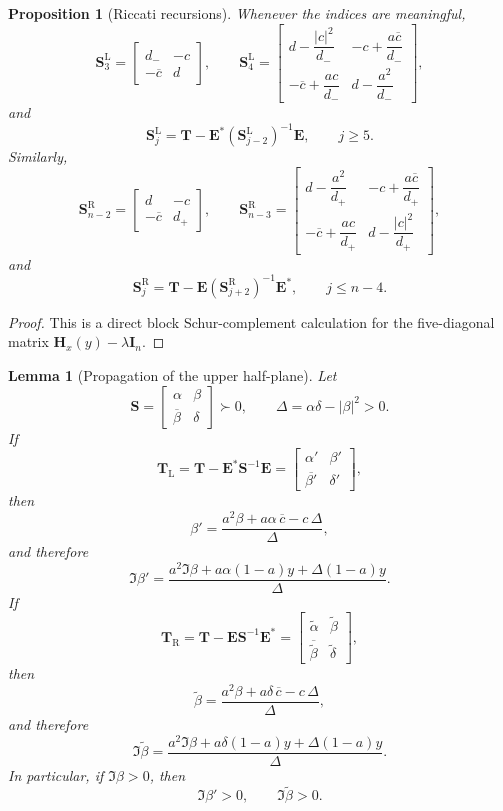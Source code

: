 \documentclass[11pt]{article}
\numberwithin{equation}{section}
\newtheorem{proposition}[theorem]{Proposition}
\newtheorem{lemma}[theorem]{Lemma}
\begin{document}
\begin{proposition}[Riccati recursions]\label{prop:schur-rec}
Whenever the indices are meaningful,
\[
\mathbf S_3^{\mathrm L}
=
\begin{bmatrix}
d_- & -c\\
-\overline c & d
\end{bmatrix},
\qquad
\mathbf S_4^{\mathrm L}
=
\begin{bmatrix}
d-\dfrac{|c|^2}{d_-} & -c+\dfrac{a\overline c}{d_-}\\[3mm]
-\overline c+\dfrac{ac}{d_-} & d-\dfrac{a^2}{d_-}
\end{bmatrix},
\]
and
\[
\mathbf S_j^{\mathrm L}
=
\mathbf T-\mathbf E^*(\mathbf S_{j-2}^{\mathrm L})^{-1}\mathbf E,
\qquad
j\ge5.
\]
Similarly,
\[
\mathbf S_{n-2}^{\mathrm R}
=
\begin{bmatrix}
d & -c\\
-\overline c & d_+
\end{bmatrix},
\qquad
\mathbf S_{n-3}^{\mathrm R}
=
\begin{bmatrix}
d-\dfrac{a^2}{d_+} & -c+\dfrac{a\overline c}{d_+}\\[3mm]
-\overline c+\dfrac{ac}{d_+} & d-\dfrac{|c|^2}{d_+}
\end{bmatrix},
\]
and
\[
\mathbf S_j^{\mathrm R}
=
\mathbf T-\mathbf E(\mathbf S_{j+2}^{\mathrm R})^{-1}\mathbf E^*,
\qquad
j\le n-4.
\]
\end{proposition}

\begin{proof}
This is a direct block Schur-complement calculation for the five-diagonal
matrix $\mathbf H_x(y)-\lambda\mathbf I_n$.
\end{proof}

\begin{lemma}[Propagation of the upper half-plane]\label{lem:propagate}
Let
\[
\mathbf S=
\begin{bmatrix}
\alpha & \beta\\
\overline\beta & \delta
\end{bmatrix}\succ0,
\qquad
\Delta=\alpha\delta-|\beta|^2>0.
\]
If
\[
\mathbf T_{\mathrm L}
=
\mathbf T-\mathbf E^*\mathbf S^{-1}\mathbf E
=
\begin{bmatrix}
\alpha' & \beta'\\
\overline{\beta'} & \delta'
\end{bmatrix},
\]
then
\[
\beta'
=
\frac{a^2\beta+a\alpha\,\overline c-c\,\Delta}{\Delta},
\]
and therefore
\[
\Im\beta'
=
\frac{a^2\Im\beta+a\alpha(1-a)y+\Delta(1-a)y}{\Delta}.
\]
If
\[
\mathbf T_{\mathrm R}
=
\mathbf T-\mathbf E\mathbf S^{-1}\mathbf E^*
=
\begin{bmatrix}
\widetilde\alpha & \widetilde\beta\\
\overline{\widetilde\beta} & \widetilde\delta
\end{bmatrix},
\]
then
\[
\widetilde\beta
=
\frac{a^2\beta+a\delta\,\overline c-c\,\Delta}{\Delta},
\]
and therefore
\[
\Im\widetilde\beta
=
\frac{a^2\Im\beta+a\delta(1-a)y+\Delta(1-a)y}{\Delta}.
\]
In particular, if $\Im\beta>0$, then
\[
\Im\beta'>0,
\qquad
\Im\widetilde\beta>0.
\]
\end{lemma}
\end{document}
